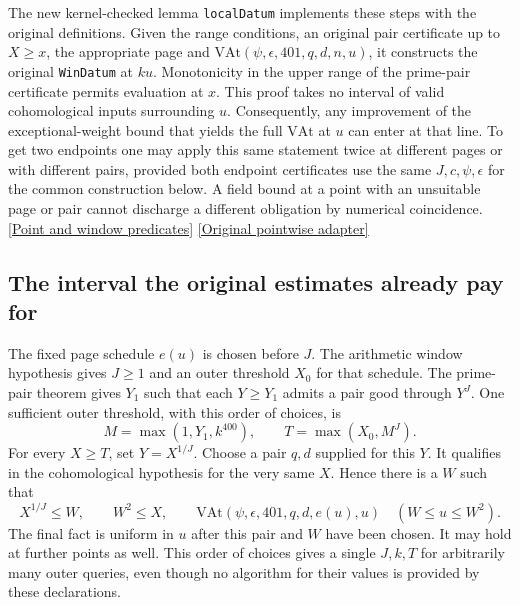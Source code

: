 \documentclass[12pt,letterpaper]{article}
\begin{document}
The new kernel-checked lemma \texttt{localDatum} implements these steps with the original definitions. Given the range conditions, an original pair certificate up to \(X\ge x\), the appropriate page and \(\mathrm{VAt}(\psi,\epsilon,401,q,d,n,u)\), it constructs the original \texttt{WinDatum} at \(ku\). Monotonicity in the upper range of the prime-pair certificate permits evaluation at \(x\). This proof takes no interval of valid cohomological inputs surrounding \(u\). Consequently, any improvement of the exceptional-weight bound that yields the full \(\mathrm{VAt}\) at \(u\) can enter at that line. To get two endpoints one may apply this same statement twice at different pages or with different pairs, provided both endpoint certificates use the same \(J,c,\psi,\epsilon\) for the common construction below. A field bound at a point with an unsuitable page or pair cannot discharge a different obligation by numerical coincidence.
\href{https://github.com/nousentllc/riemann-hypothesis/blob/40e56bab026552e089d7afcfeff08d2defb9c005/src/Development/AutomorphicArithmetic/CharacterBoxes/ExistsPageN.lean#L39-L62}{[Point and window predicates]}
\href{https://github.com/nousentllc/riemann-hypothesis/blob/40e56bab026552e089d7afcfeff08d2defb9c005/src/Development/AutomorphicArithmetic/CharacterBoxes/WinPairs.lean#L56-L81}{[Original pointwise adapter]}

\subsection{The interval the original estimates already pay for}

The fixed page schedule \(e(u)\) is chosen before \(J\). The arithmetic window hypothesis gives \(J\ge1\) and an outer threshold \(X_0\) for that schedule. The prime-pair theorem gives \(Y_1\) such that each \(Y\ge Y_1\) admits a pair good through \(Y^J\). One sufficient outer threshold, with this order of choices, is
\[
 M=\max(1,Y_1,k^{400}),\qquad T=\max(X_0,M^J).
\]
For every \(X\ge T\), set \(Y=X^{1/J}\). Choose a pair \(q,d\) supplied for this \(Y\). It qualifies in the cohomological hypothesis for the very same \(X\). Hence there is a \(W\) such that
\[
       X^{1/J}\le W,\qquad W^2\le X,\qquad
       \mathrm{VAt}(\psi,\epsilon,401,q,d,e(u),u)
                         \quad(W\le u\le W^2).
\]
The final fact is uniform in \(u\) after this pair and \(W\) have been chosen. It may hold at further points as well. This order of choices gives a single \(J,k,T\) for arbitrarily many outer queries, even though no algorithm for their values is provided by these declarations.
\end{document}
